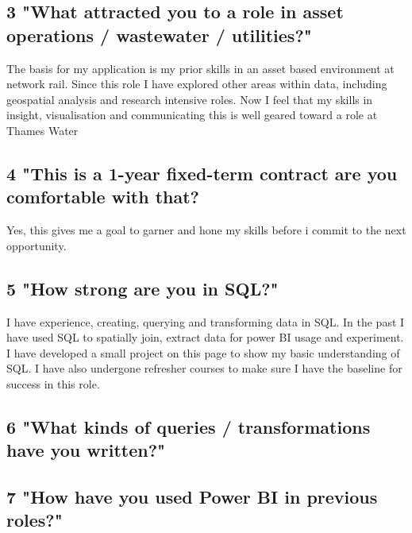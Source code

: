 \documentclass[
  letterpaper,
]{scrbook}
\begin{document}
\subsection{3 "What attracted you to a role in asset operations /
wastewater /
utilities?"}\label{what-attracted-you-to-a-role-in-asset-operations-wastewater-utilities}

The basis for my application is my prior skills in an asset based
environment at network rail. Since this role I have explored other areas
within data, including geospatial analysis and research intensive roles.
Now I feel that my skills in insight, visualisation and communicating
this is well geared toward a role at Thames Water

\subsection{4 "This is a 1-year fixed-term contract are you comfortable
with
that?}\label{this-is-a-1-year-fixed-term-contract-are-you-comfortable-with-that}

Yes, this gives me a goal to garner and hone my skills before i commit
to the next opportunity.

\subsection{5 "How strong are you in
SQL?"}\label{how-strong-are-you-in-sql}

I have experience, creating, querying and transforming data in SQL. In
the past I have used SQL to spatially join, extract data for power BI
usage and experiment. I have developed a small project on this page to
show my basic understanding of SQL. I have also undergone refresher
courses to make sure I have the baseline for success in this role.

\subsection{\texorpdfstring{6 \textbf{"What kinds of queries /
transformations have you
written?"}}{6 "What kinds of queries / transformations have you written?"}}\label{what-kinds-of-queries-transformations-have-you-written}

\subsection{7 "How have you used Power BI in previous
roles?"}\label{how-have-you-used-power-bi-in-previous-roles}
\end{document}
